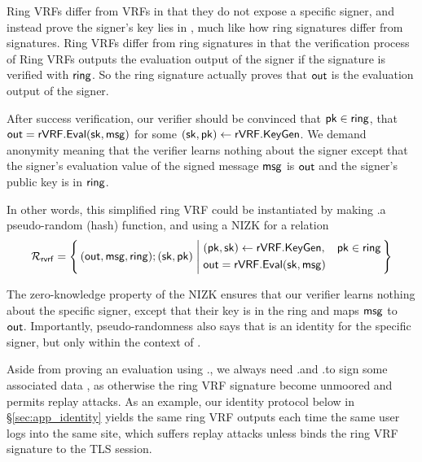 Ring VRFs differ from VRFs in that they do not expose a specific signer,
and instead prove the signer's key lies in  \ring,
much like how ring signatures differ from signatures.
Ring VRFs differ from ring signatures in that the verification process of Ring VRFs outputs the evaluation output \Out of the signer if the signature is verified with $ \mathsf{ring} $. So  the ring signature  actually proves that $ {\mathsf{out}} $ is the evaluation output of the signer. 




After success verification, our verifier should be convinced that $\mathsf{pk} \in \mathsf{ring}$, that
${\mathsf{out}} = {\mathsf{rVRF}}.{\mathsf{Eval}}(\mathsf{sk},\mathsf{msg})$ for some $(\mathsf{sk},\mathsf{pk}) \leftarrow {\ensuremath{\mathsf{rVRF}}}.{\mathsf{KeyGen}}$. We demand anonymity meaning that the verifier learns nothing about the signer except that the signer's evaluation value of the signed message $ \mathsf{msg} $ is $ {\mathsf{out}} $ and the signer's public key is in $ \mathsf{ring} $.

In other words, this simplified ring VRF could be instantiated by making
\rVRF.\Eval a pseudo-random (hash) function, and using a NIZK for a relation
\vspace{-3mm}
$$ \rel_{\mathsf{rvrf}} = \Setst{ (\Out, \msg, \ring);(\sk,\pk)}{
		\begin{aligned}
			& (\pk,\sk) \leftarrow \rVRF.\KeyGen,
			& \pk \in \ring \\
			& \Out = \rVRF.\Eval(\sk,\msg)
		\end{aligned}
} $$



The zero-knowledge property of the NIZK ensures that our verifier learns nothing about the specific
signer, except that their key is in the ring and maps $\mathsf{msg}$ to ${\mathsf{out}}$.
Importantly, pseudo-randomness also says that \Out is an identity
for the specific signer, but only within the context of \msg.


Aside from proving an evaluation using \rVRF.\Eval, 
we always need \rVRF.\Sign and \rVRF.\Verify to sign some associated data \aux,
as otherwise the ring VRF signature become unmoored and permits replay attacks.
%
As an example, our identity protocol below in \S\ref{sec:app_identity}
yields the same ring VRF outputs each time the same user logs into the
same site, which suffers replay attacks unless \aux binds the
ring VRF signature to the TLS session.


